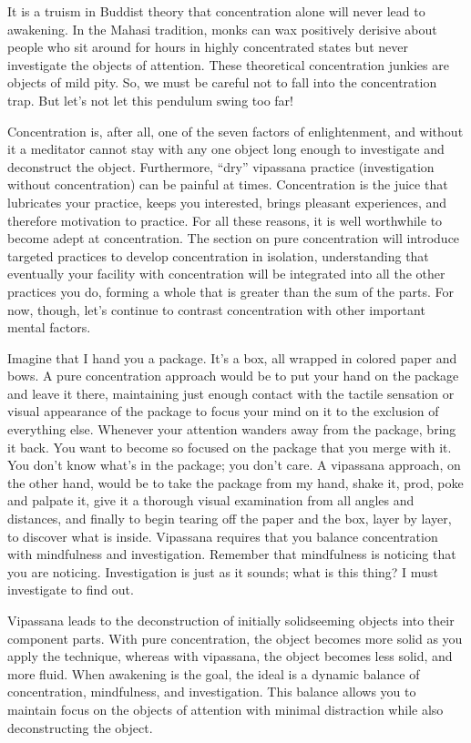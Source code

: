 \documentclass[a5paper,10pt,english]{book}
\begin{document}
\sphinxAtStartPar
It is a truism in Buddist theory that concentration alone will never
lead to awakening. In the Mahasi tradition, monks can wax positively
derisive about people who sit around for hours in highly concentrated
states but never investigate the objects of attention. These theoretical
concentration junkies are objects of mild pity. So, we must be careful
not to fall into the concentration trap. But let’s not let this pendulum
swing too far!

\sphinxAtStartPar
Concentration is, after all, one of the seven factors of enlightenment,
and without it a meditator cannot stay with any one object long enough
to investigate and deconstruct the object. Furthermore, “dry” vipassana
practice (investigation without concentration) can be painful at times.
Concentration is the juice that lubricates your practice, keeps you
interested, brings pleasant experiences, and therefore motivation to
practice. For all these reasons, it is well worthwhile to become adept
at concentration. The section on pure concentration will introduce
targeted practices to develop concentration in isolation, understanding
that eventually your facility with concentration will be integrated into
all the other practices you do, forming a whole that is greater than the
sum of the parts. For now, though, let’s continue to contrast
concentration with other important mental factors.

\sphinxAtStartPar
Imagine that I hand you a package. It’s a box, all wrapped in colored
paper and bows. A pure concentration approach would be to put your hand
on the package and leave it there, maintaining just enough contact with
the tactile sensation or visual appearance of the package to focus your
mind on it to the exclusion of everything else. Whenever your attention
wanders away from the package, bring it back. You want to become so
focused on the package that you merge with it. You don’t know what’s in
the package; you don’t care. A vipassana approach, on the other hand,
would be to take the package from my hand, shake it, prod, poke and
palpate it, give it a thorough visual examination from all angles and
distances, and finally to begin tearing off the paper and the box, layer
by layer, to discover what is inside. Vipassana requires that you
balance concentration with mindfulness and investigation. Remember that
mindfulness is noticing that you are noticing. Investigation is just as
it sounds; what is this thing? I must investigate to find out.

\sphinxAtStartPar
Vipassana leads to the deconstruction of initially solid\sphinxhyphen{}seeming objects
into their component parts. With pure concentration, the object becomes
more solid as you apply the technique, whereas with vipassana, the
object becomes less solid, and more fluid. When awakening is the goal,
the ideal is a dynamic balance of concentration, mindfulness, and
investigation. This balance allows you to maintain focus on the objects
of attention with minimal distraction while also deconstructing the
object.
\end{document}
